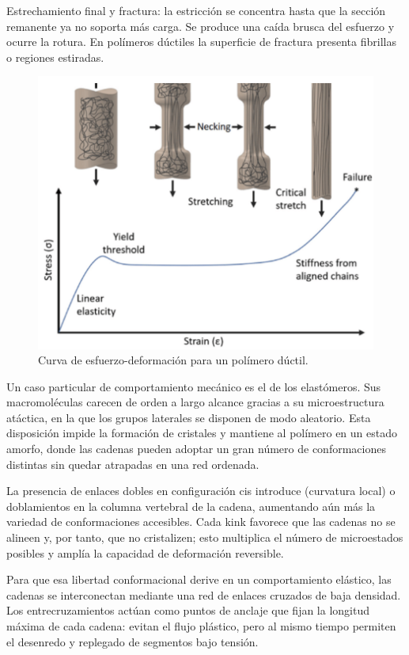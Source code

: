 Estrechamiento final y fractura: la estricción se concentra hasta que la sección remanente ya no soporta más carga. Se produce una caída brusca del esfuerzo y ocurre la rotura. En polímeros dúctiles la superficie de fractura presenta fibrillas o regiones estiradas.


\begin{figure}[h!]
    \centering
    \includegraphics[width=0.8\linewidth]{imgs/estre.png}
    \caption{Curva de esfuerzo-deformación para un polímero dúctil.}
    \label{plastens}
\end{figure}

Un caso particular de comportamiento mecánico es el de los elastómeros. Sus macromoléculas carecen de orden a largo alcance gracias a su microestructura atáctica, en la que los grupos laterales se disponen de modo aleatorio. Esta disposición impide la formación de cristales y mantiene al polímero en un estado amorfo, donde las cadenas pueden adoptar un gran número de conformaciones distintas sin quedar atrapadas en una red ordenada.

La presencia de enlaces dobles en configuración cis introduce  (curvatura local) o doblamientos en la columna vertebral de la cadena, aumentando aún más la variedad de conformaciones accesibles. Cada kink favorece que las cadenas no se alineen y, por tanto, que no cristalizen; esto multiplica el número de microestados posibles y amplía la capacidad de deformación reversible.

Para que esa libertad conformacional derive en un comportamiento elástico, las cadenas se interconectan mediante una red de enlaces cruzados de baja densidad. Los entrecruzamientos actúan como puntos de anclaje que fijan la longitud máxima de cada cadena: evitan el flujo plástico, pero al mismo tiempo permiten el desenredo y replegado de segmentos bajo tensión.

